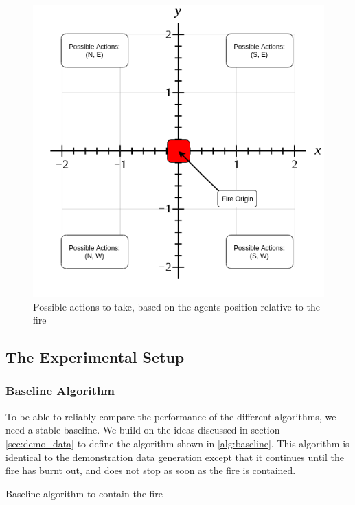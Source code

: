 \begin{figure}[h]
    \centering
    \includegraphics[width=1\linewidth]{img/Demo-data_Baseline.png}
    \caption{Possible actions to take, based on the agents position relative to the fire}
    \label{fig:demodata}
\end{figure}



\subsection{The Experimental Setup}\label{sec:experiment}

\subsubsection{Baseline Algorithm}\label{sec:baseline}
To be able to reliably compare the performance of the different algorithms, we need a stable baseline. We build on the ideas discussed in section \ref{sec:demo_data} to define the algorithm shown in \ref{alg:baseline}. This algorithm is identical to the demonstration data generation except that it continues until the fire has burnt out, and does not stop as soon as the fire is contained.

\begin{algorithm}
  \caption{Baseline algorithm to contain the fire}
  \label{alg:baseline}
  \begin{algorithmic}[1]
    \EndIf
    \EndWhile
    \State {}
    \EndProcedure
  \end{algorithmic}
\end{algorithm}

